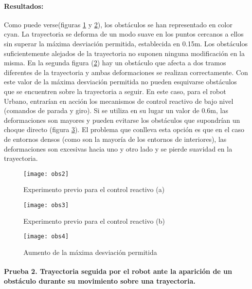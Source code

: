 \paragraph{Resultados:} 
Como puede verse(figuras \ref{fg:react1a} y \ref{fg:react1b}), los obstáculos se han representado en color cyan. La trayectoria se deforma de un modo suave en los puntos cercanos a ellos sin superar la máxima desviación permitida, establecida en 0.15m. Los obstáculos suficientemente alejados de la trayectoria no suponen ninguna modificación en la misma. En la segunda figura (\ref{fg:react1b}) hay un obstáculo que afecta a dos tramos diferentes de la trayectoria y ambas deformaciones se realizan correctamente. Con este valor de la máxima desviación permitida no pueden esquivarse obstáculos que se encuentren sobre la trayectoria a seguir. En este caso, para el robot Urbano, entrarían en acción los mecanismos de control reactivo de bajo nivel (comandos de parada y giro). Si se utiliza en su lugar un valor de 0.6m, las deformaciones son mayores y pueden evitarse los obstáculos que supondrían un choque directo (figura \ref{fg:react2}). El problema que conlleva esta opción es que en el caso de entornos densos (como son la mayoría de los entornos de interiores), las deformaciones son excesivas hacia uno y otro lado y se pierde suavidad en la trayectoria.

\begin{figure}[h]
  \centering\texttt{[image: obs2]}\\
    \caption{Experimento previo para el control reactivo (a)}\label{fg:react1a}
  \end{figure}
  
\begin{figure}[h]
  \centering\texttt{[image: obs3]}
  \caption{Experimento previo para el control reactivo (b)}\label{fg:react1b}
\end{figure}


\begin{figure}[h]
  \centering\texttt{[image: obs4]}\\
  \caption{Aumento de la máxima desviación permitida}\label{fg:react2}
\end{figure}

\clearpage

\paragraph{Prueba 2. Trayectoria seguida por el robot ante la aparición de un obstáculo durante su movimiento sobre una trayectoria.}\ %

